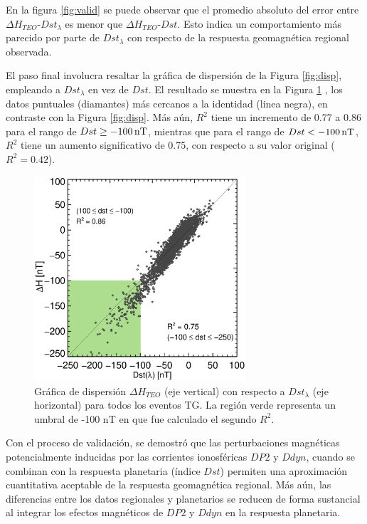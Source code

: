 En la figura \ref{fig:valid} se puede observar que el promedio absoluto del error entre $\Delta H_{TEO}$-$Dst_\lambda$ es menor que $\Delta H_{TEO}$-$Dst$. Esto indica un comportamiento más parecido por parte de $Dst_\lambda$ con respecto de la respuesta geomagnética regional observada. 
\vspace{1 em}

El paso final involucra resaltar la gráfica de dispersión de la Figura \ref{fig:disp}, empleando a $Dst_\lambda$ en vez de $Dst$. El resultado se muestra en la Figura \ref{fig:valid_disp2} , los datos puntuales (diamantes) más cercanos a la identidad (linea negra), en contraste con la Figura \ref{fig:disp}. Más aún, $R^2$ tiene un incremento de 0.77 a 0.86 para el rango de $Dst \ge -100\, {\rm nT}$, mientras que para el rango de $Dst < -100\, {\rm nT}$, $R^2$ tiene un aumento significativo de 0.75, con respecto a su valor original ($R^2=0.42$).
\vspace{1 em}

\begin{figure}
    \centering
     \includegraphics[width=0.7\textwidth]{Images/dispersion_general_dst_ld.eps}
      \caption{Gráfica de dispersión $\Delta H_{TEO}$ (eje vertical) con respecto a $Dst_\lambda$ (eje horizontal) para todos los eventos TG. La región verde representa un umbral de -100 nT en que fue calculado el segundo $R^2$.}
       \label{fig:valid_disp2}
\end{figure}

Con el proceso de validación, se demostró que las perturbaciones magnéticas potencialmente inducidas por las corrientes ionosféricas $DP2$ y $Ddyn$, cuando se combinan con la respuesta planetaria (índice $Dst$) permiten una aproximación cuantitativa aceptable de la respuesta geomagnética regional. Más aún, las diferencias entre los datos regionales y planetarios se reducen de forma sustancial al integrar los efectos magnéticos de $DP2$ y $Ddyn$ en la respuesta planetaria.
\vspace{1 em}

